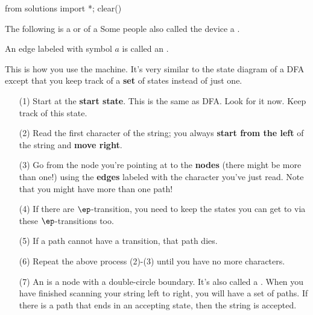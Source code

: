 \begin{python0}
  from solutions import *; clear()
\end{python0}

The following is a
 or 
\tinysidebarskip{}
of a
Some people also called the device a
\sidebarskip{24pt}
.
\sidebarskip{0pt}

\begin{center}
\end{center}


An edge labeled with symbol $a$ is called an
.




This is how you use the machine. It's very similar to the state
diagram of a DFA except that you keep track of a
\textbf{set} of states
instead of just one.

\begin{itemize}
  \item[(1)] Start at the \textbf{start state}.
   This is the same as DFA. Look for it now. Keep track of this
   state.
 \item[(2)] Read the first character of the string; you always
 \textbf{start from the left} of the string and
 \textbf{move right}.
 \item[(3)] Go from the node you're pointing at to the
 \textbf{nodes}
 (there might be more than one!)
 using
 the \textbf{edges} labeled with the character you've just read.
 Note that you might have more than one path!
 \item[(4)] If there are $\ep$-transition, you need to keep the
  states
 you can get to via these $\ep$-transitions too.
 \item[(5)] If a path cannot have a transition, that path dies.
 \item[(6)] Repeat the above process (2)-(3) until you have no more characters.
 \item[(7)]
   An
   is a node with a double-circle boundary.
   It's also called a
   .
   When you have finished scanning your string left to right,
   you will have a set of paths.
   If there is a path that ends in an accepting state, then the
   string is accepted.
\end{itemize}



